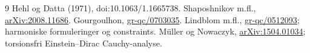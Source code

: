 \documentclass[11pt,a4paper]{article}
\begin{document}
\begin{thebibliography}{9}
 Hehl og Datta (1971), doi:10.1063/1.1665738.
 Shaposhnikov m.fl., \href{https://arxiv.org/abs/2008.11686}{arXiv:2008.11686}.
 Gourgoulhon, \href{https://arxiv.org/abs/gr-qc/0703035}{gr-qc/0703035}.
 Lindblom m.fl., \href{https://arxiv.org/abs/gr-qc/0512093}{gr-qc/0512093}; harmoniske formuleringer og constraints.
 M\"uller og Nowaczyk, \href{https://arxiv.org/abs/1504.01034}{arXiv:1504.01034}; torsionsfri Einstein--Dirac Cauchy-analyse.
\end{thebibliography}
\end{document}
